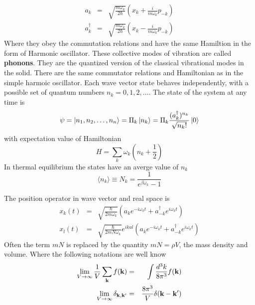 \begin{eqnarray}
    a_k &=& \sqrt{ \frac{m\omega_k}{2\hbar}}  \left( x_k + \frac{i}{m\omega_k} p_{-k} \right)  \label{1.65}  \\
    a^\dagger_k &=& \sqrt{ \frac{m\omega_k}{2\hbar} }  \left( x_k - \frac{i}{m\omega_k} p_{-k} \right)  \label{1.66}
\end{eqnarray}
Where they obey the commutation relations and have the same Hamiltion in the form of Harmonic oscillator.
These collective modes of vibration are called \textbf{phonons}.
They are the quantized version of the classical vibrational modes in the solid.
There are the same commutator relations and Hamiltonian as in the simple harmoic oscillator.
Each wave vector state behaves independently, with a possible set of quantum numbers $n_k=0,1,2,\dots$.
The state of the system at any time is
\begin{equation}
    \psi = \ket{n_1,n_2,\dots,n_n} = \Pi_k \ket{n_k} = \Pi_k \frac{(a^\dagger_k)^{n_k}}{\sqrt{n_k !}} \ket{0}   \label{1.71}
\end{equation}
with expectation value of Hamiltonian
\begin{equation}
    H= \sum_k \omega_k (n_k + \frac{1}{2})  \label{1.72}
\end{equation}
In thermal equilibrium the states have an averge value of $n_k$
\begin{equation}
    \langle n_k \rangle \equiv N_k = \frac{1}{e^{\beta \omega_k}-1} \label{1.73}
\end{equation}

The position operator in wave vector and real space is
\begin{eqnarray}
    x_k(t) &=& \sqrt{ \frac{\hbar}{2m\omega_k} } \left(a_k e^{-i\omega_k t} + a^\dagger_{-k} e^{i\omega_k t} \right) \nonumber \\
    x_l(t) &=&  \sqrt{ \frac{\hbar}{2mN\omega_k} }e^{ikal} \left(a_k e^{-i\omega_k t} + a^\dagger_{-k} e^{i\omega_k t} \right)    \label{1.74}
\end{eqnarray}
Often the term $mN$ is replaced by the quantity $mN = \rho V$, the mass density and volume.
Where the following notations are well know
\begin{eqnarray}
    \lim_{V\to \infty} \frac{1}{V} \sum_{\mathbf{k}} f(\mathbf{k}) &=& \int \frac{d^3 k}{8\pi^3} f(\mathbf{k})   \label{1.75} \\
    \lim_{V\to \infty} \delta_{\mathbf{k},\mathbf{k}'} &=& \frac{8\pi^3}{V} \delta(\mathbf{k}-\mathbf{k}')    \label{1.78}
\end{eqnarray}

